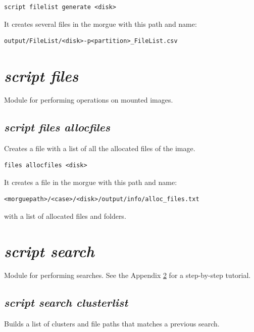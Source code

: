 \documentclass[a4paper,11pt,oneside]{report}
\begin{document}
\begin{verbatim}
script filelist generate <disk>
\end{verbatim}

It creates several files in the morgue with this path and name:

\begin{verbatim}
output/FileList/<disk>-p<partition>_FileList.csv
\end{verbatim}






\section{\emph{script files}}

Module for performing operations on mounted images.

\subsection{\emph{script files allocfiles}} 

Creates a file with a list of all the allocated files of the image.

\begin{verbatim}
files allocfiles <disk>
\end{verbatim}

It creates a file in the morgue with this path and name:

\begin{verbatim}
<morguepath>/<case>/<disk>/output/info/alloc_files.txt
\end{verbatim}

with a list of allocated files and folders.





\section{\emph{script search}} \label{anx:searches}

Module for performing searches. See the Appendix \ref{anx:searches} for a step-by-step tutorial.


\subsection{\emph{script search clusterlist}}

Builds a list of clusters and file paths that matches a previous search.
\end{document}
